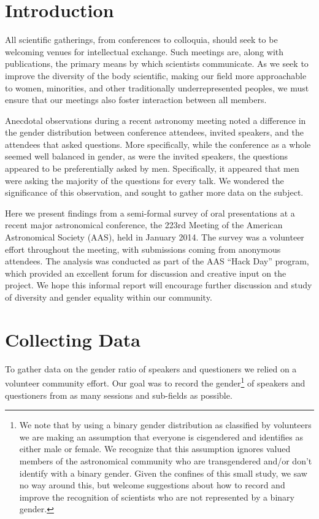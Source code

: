 \documentclass[iop]{emulateapj}
\begin{document}
\section{Introduction}
All scientific gatherings, from conferences to colloquia, should seek to be welcoming venues for intellectual exchange. Such meetings are, along with publications, the primary means by which scientists communicate. As we seek to improve the diversity of the body scientific, making our field more approachable to women, minorities, and other traditionally underrepresented peoples, we must ensure that our meetings also foster interaction between all members.

Anecdotal observations during a recent astronomy meeting noted a difference in the gender distribution between conference attendees, invited speakers, and the attendees that asked questions. More specifically, while the conference as a whole seemed well balanced in gender, as were the invited speakers, the questions appeared to be preferentially asked by men. Specifically, it appeared that men were asking the majority of the questions for every talk. We wondered the significance of this observation, and sought to gather more data on the subject.


Here we present findings from a semi-formal survey of oral presentations at a recent major astronomical conference, the 223rd Meeting of the American Astronomical Society (AAS), held in January 2014. The survey was a volunteer effort throughout the meeting, with submissions coming from anonymous attendees. The analysis was conducted as part of the AAS ``Hack Day'' program, which provided an excellent forum for discussion and creative input on the project. We hope this informal report will encourage further discussion and study of diversity and gender equality within our community.


\section{Collecting Data}
To gather data on the gender ratio of speakers and questioners we relied on a volunteer community effort. Our goal was to record the gender\footnote{We note that by using a binary gender distribution as classified by volunteers we are making an assumption that everyone is cisgendered and identifies as either male or female. We recognize that this assumption ignores valued members of the astronomical community who are transgendered and/or don't identify with a binary gender. Given the confines of this small study, we saw no way around this, but welcome suggestions about how to record and improve the recognition of scientists who are not represented by a binary gender.} of speakers and questioners from as many sessions and sub-fields as possible. 
\end{document}
